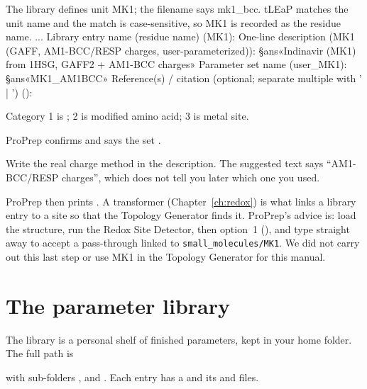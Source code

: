 \begin{steps}
\begin{screen}
The library defines unit MK1; the filename says mk1_bcc. tLEaP matches
the unit name and the match is case-sensitive, so MK1 is recorded as the
residue name.
...
Library entry name (residue name) (MK1):
One-line description (MK1 (GAFF, AM1-BCC/RESP charges, user-parameterized)):
§ans«Indinavir (MK1) from 1HSG, GAFF2 + AM1-BCC charges»
Parameter set name (user_MK1): §ans«MK1_AM1BCC»
Reference(s) / citation (optional; separate multiple with ' | ') ():
\end{screen}
        Category 1 is ; 2 is modified amino
        acid; 3 is metal site.
  \item ProPrep confirms 
        and says the set .
\end{steps}

\begin{tip}
Write the real charge method in the description. The suggested text says
``AM1-BCC/RESP charges'', which does not tell you later which one you used.
\end{tip}

ProPrep then prints . A
transformer (Chapter~\ref{ch:redox}) is what links a library entry to a site
so that the Topology Generator finds it. ProPrep's advice is: load the
structure, run the Redox Site Detector, then  option~1
(), and type  straight away to accept a
pass-through linked to \texttt{small\_molecules/MK1}. We did not carry out
this last step or use MK1 in the Topology Generator for this manual.

\section{The parameter library}
\label{sec:forcefields-library}

The library is a personal shelf of finished parameters, kept in your home
folder. The full path is

\smallskip
\centerline{}
\smallskip

\noindent with sub-folders ,  and
. Each entry
has a  and its  and  files.

